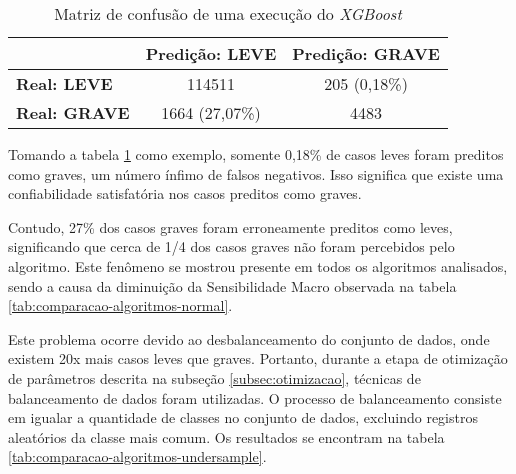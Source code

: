 \begin{table}[H]
  \footnotesize
  \centering
  \centering
  \begin{tabular}{l|c|c|}
    \cline{2-3}
    \textbf{}                         & \multicolumn{1}{l|}{\textbf{Predição: LEVE}} & \multicolumn{1}{l|}{\textbf{Predição: GRAVE}} \\ \hline
    \multicolumn{1}{|l|}{\textbf{Real: LEVE}}  & 114511                                       & 205 (0,18\%)                                           \\ \hline
    \multicolumn{1}{|l|}{\textbf{Real: GRAVE}} & 1664 (27,07\%)                                         & 4483                                          \\ \hline   
  \end{tabular}
  \caption{Matriz de confusão de uma execução do \textit{XGBoost}}
  \label{tab:matriz-confusao-xgboost}
\end{table}

Tomando a tabela \ref{tab:matriz-confusao-xgboost} como exemplo, somente 0,18\% de casos leves foram preditos como graves, um número ínfimo de falsos negativos. Isso significa que existe uma confiabilidade satisfatória nos casos preditos como graves. 

Contudo, 27\% dos casos graves foram erroneamente preditos como leves, significando que cerca de 1/4 dos casos graves não foram percebidos pelo algoritmo. Este fenômeno se mostrou presente em todos os algoritmos analisados, sendo a causa da diminuição da Sensibilidade Macro observada na tabela \ref{tab:comparacao-algoritmos-normal}.

Este problema ocorre devido ao desbalanceamento do conjunto de dados, onde existem 20x mais casos leves que graves. Portanto, durante a etapa de otimização de parâmetros descrita na subseção \ref{subsec:otimizacao}, técnicas de balanceamento de dados foram utilizadas. O processo de balanceamento consiste em igualar a quantidade de classes no conjunto de dados, excluindo registros aleatórios da classe mais comum. Os resultados se encontram na tabela \ref{tab:comparacao-algoritmos-undersample}.

